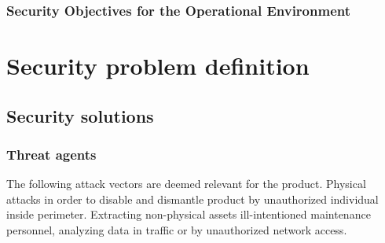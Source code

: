 \documentclass[10pt]{article}
\begin{document}
  \subsubsection{Security Objectives for the Operational Environment}
	\begin{itemize}
	\end{itemize}

  \section{Security problem definition}

    \subsection{Security solutions}



 \subsubsection{Threat agents}

      The following attack vectors are deemed relevant for the product.
      Physical attacks in order to disable and dismantle product by
      unauthorized individual inside perimeter. Extracting non-physical
      assets ill-intentioned maintenance personnel, analyzing data in
      traffic or by unauthorized network access.
\end{document}

